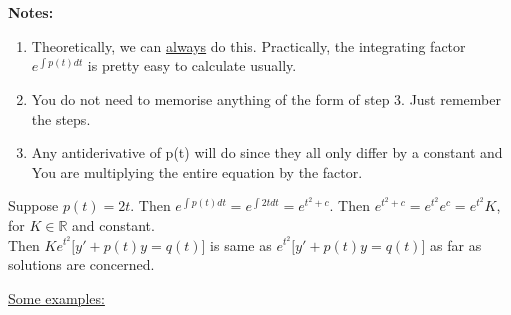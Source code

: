 \redhline\\\\
\textbf{\large Notes:}
\begin{enumerate}[label=\protect\circled{\arabic*}]
	\item Theoretically, we can \underline{always} do this. Practically, the integrating factor $e^{\int p(t) dt}$ is pretty easy to calculate usually.
	\item You do not need to memorise anything of the form of step 3. Just remember the steps.
	\item Any antiderivative of p(t) will do since  they all only differ by a constant and  You are multiplying the entire equation by the factor. \\
\end{enumerate}
\begin{example-N}
	Suppose $p(t) = 2t$. Then $e^{\int p(t) dt} = e^{\int 2t dt} = e^{t^2 + c}$. Then $e^{t^2 + c} = e^{t^2} e^c = e^{t^2}K$, for $K\in \mathbb{R}$ and constant.\\
	Then $Ke^{t^2}\big[y'+p(t)y = q(t)\big]$ is same as $e^{t^2}\big[y'+p(t)y = q(t)\big]$ as far as solutions are concerned.
\end{example-N}
\newpage
\underline{\huge Some examples:}

